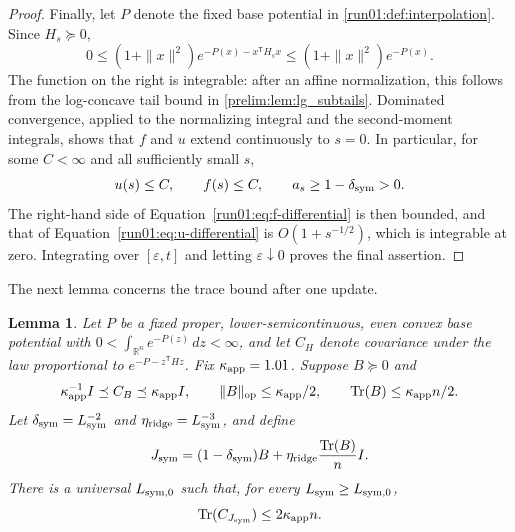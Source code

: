 \documentclass[11pt]{article}
\numberwithin{equation}{section}
\newtheorem{lemma}{Lemma}[section]
\theoremstyle{definition}
\begin{document}
\begin{proof}
Finally, let $P$ denote the fixed base potential in
\cref{run01:def:interpolation}.
Since $H_s\succeq0$,
\[
0
\leq (1+\|x\|^2)e^{-P(x)-x^{\mathsf T}H_sx}
\leq (1+\|x\|^2)e^{-P(x)}.
\]
The function on the right is integrable: after an affine normalization, this
follows from the log-concave tail bound in \cref{prelim:lem:lg_subtails}.
Dominated convergence, applied to the normalizing integral and the second-moment
integrals, shows that $f$ and
$u$ extend continuously to
$s=0$.
In particular, for some $C<\infty$ and all sufficiently small
$s$,
\[
u(s)\leq C,
\qquad
f(s)\leq C,
\qquad
a_s
\geq1-\delta_{\rm sym}
>0.
\]
The right-hand side of Equation~\eqref{run01:eq:f-differential} is then bounded,
and that of Equation~\eqref{run01:eq:u-differential} is $O(1+s^{-1/2})$, which
is integrable at zero.
Integrating over $[\varepsilon,t]$ and letting
$\varepsilon\downarrow0$ proves the final assertion.
\end{proof}

The next lemma concerns the trace bound after one update.

\begin{lemma}
\label{run01:lem:endpoint-trace}
Let $P$ be a fixed proper, lower-semicontinuous, even convex base potential with
$0<\int_{\mathbb R^n}e^{-P(z)}\,dz<\infty$, and let
$C_H$ denote covariance under the law proportional to
$e^{-P-z^{\mathsf T} Hz}$.
Fix $\kappa_{\rm app}=1.01$.
Suppose $B\succeq0$ and
\[
\kappa_{\rm app}^{-1}I
\preceq C_B
\preceq\kappa_{\rm app}I,
\qquad
\|B\|_{\mathrm{op}}\leq\kappa_{\rm app}/2,
\qquad
\operatorname{Tr}(B)\leq\kappa_{\rm app}n/2.
\]
Let $\delta_{\rm sym}=L_{\rm sym}^{-2}$ and
$\eta_{\rm ridge}=L_{\rm sym}^{-3}$, and define
\[
 J_{\rm sym}=(1-\delta_{\rm sym})B+
 \eta_{\rm ridge}\frac{\operatorname{Tr}(B)}nI.
\]
There is a universal $L_{{\rm sym},0}$ such that, for every
$L_{\rm sym}\geq L_{{\rm sym},0}$,
\[
 \operatorname{Tr}(C_{J_{\rm sym}})\leq2\kappa_{\rm app}n.
\]
\end{lemma}
\end{document}

